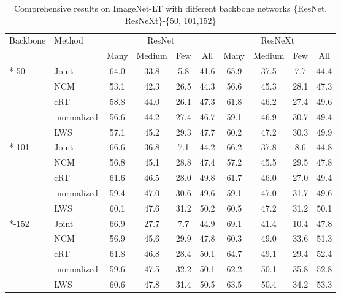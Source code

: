 \documentclass[dvipsnames]{article} \usepackage{iclr2020_conference, times}
\newcommand{\joint}{Joint\xspace}
\newcommand{\ncm}{NCM\xspace}
\newcommand{\retrain}{cRT\xspace}
\newcommand{\wnorm}{-normalized\xspace}
\newcommand{\LWS}{LWS}
\newcommand{\wscale}{\LWS}
\begin{document}
\begin{table}[h]
\small
\caption{Comprehensive results on ImageNet-LT with different backbone networks  \{ResNet, ResNeXt\}-\{50, 101,152\}}
\label{tab:imnet_extra}
\begin{center}
\begin{tabular}{ll|cccc|cccc}
\toprule
\multirow{2}{*}{Backbone} & \multirow{2}{*}{Method} & \multicolumn{4}{c}{ResNet} & \multicolumn{4}{|c}{ResNeXt} \\
 &  & Many & Medium & Few & All & Many & Medium & Few & All\\
\midrule
\multirow{4}{*}{*-50}
&\joint & 64.0 & 33.8 & 5.8 & 41.6 & 65.9 & 37.5 & 7.7 & 44.4 \\
& \ncm & 53.1 & 42.3 & 26.5 & 44.3 & 56.6 & 45.3 & 28.1 & 47.3\\
& \retrain & 58.8 & 44.0 & 26.1 & 47.3 & 61.8 & 46.2 & 27.4 & 49.6\\
& \wnorm & 56.6 & 44.2 & 27.4 & 46.7 & 59.1 & 46.9 & 30.7 & 49.4\\
& \wscale & 57.1 & 45.2 & 29.3 & 47.7 & 60.2 & 47.2 & 30.3 & 49.9 \\
\midrule
\multirow{4}{*}{*-101}
& \joint & 66.6 & 36.8 & 7.1 & 44.2 & 66.2 & 37.8 & 8.6 & 44.8 \\
& \ncm & 56.8 & 45.1 & 28.8 & 47.4 & 57.2 & 45.5 & 29.5 & 47.8 \\
& \retrain & 61.6 & 46.5 & 28.0 & 49.8 & 61.7 & 46.0 & 27.0 & 49.4 \\
& \wnorm & 59.4 & 47.0 & 30.6 & 49.6 & 59.1 & 47.0 & 31.7 & 49.6  \\
& \wscale & 60.1 & 47.6 & 31.2 & 50.2 & 60.5 & 47.2 & 31.2 & 50.1 \\
\midrule
\multirow{4}{*}{*-152}
& \joint & 66.9 & 27.7 & 7.7 & 44.9 & 69.1 & 41.4 & 10.4 & 47.8 \\
& \ncm & 56.9 & 45.6 & 29.9 & 47.8 & 60.3 & 49.0 & 33.6 & 51.3 \\
& \retrain & 61.8 & 46.8 & 28.4 & 50.1 & 64.7 & 49.1 & 29.4 & 52.4 \\
& \wnorm & 59.6 & 47.5 & 32.2 & 50.1 & 62.2 & 50.1 & 35.8 & 52.8 \\
& \wscale & 60.6 & 47.8 & 31.4 & 50.5 & 63.5 & 50.4 & 34.2 & 53.3 \\
\bottomrule
\end{tabular}
\end{center}
\vspace{-0.5cm}
\end{table}
\end{document}
